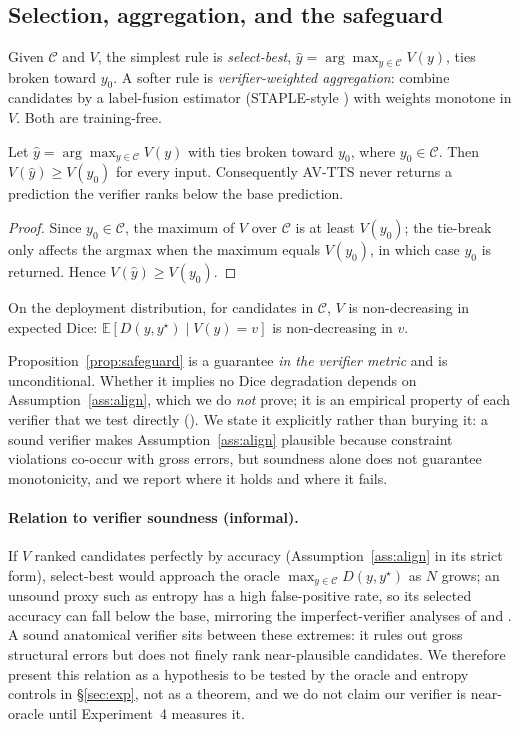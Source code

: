 \documentclass[10pt,twocolumn]{article}
\begin{document}
\subsection{Selection, aggregation, and the safeguard}
Given $\mathcal{C}$ and $V$, the simplest rule is \emph{select-best}, $\hat y=\arg\max_{y\in\mathcal{C}}V(y)$, ties broken toward $y_0$. A softer rule is \emph{verifier-weighted aggregation}: combine candidates by a label-fusion estimator (STAPLE-style \citep{warfield2004staple}) with weights monotone in $V$. Both are training-free.

\begin{proposition}\label{prop:safeguard}
Let $\hat y=\arg\max_{y\in\mathcal{C}}V(y)$ with ties broken toward $y_0$, where $y_0\in\mathcal{C}$. Then $V(\hat y)\ge V(y_0)$ for every input. Consequently AV-TTS never returns a prediction the verifier ranks below the base prediction.
\end{proposition}
\begin{proof}
Since $y_0\in\mathcal{C}$, the maximum of $V$ over $\mathcal{C}$ is at least $V(y_0)$; the tie-break only affects the argmax when the maximum equals $V(y_0)$, in which case $y_0$ is returned. Hence $V(\hat y)\ge V(y_0)$.
\end{proof}

\begin{assumption}\label{ass:align}
On the deployment distribution, for candidates in $\mathcal{C}$, $V$ is non-decreasing in expected Dice: $\mathbb{E}[D(y,y^\star)\mid V(y)=v]$ is non-decreasing in $v$.
\end{assumption}
Proposition~\ref{prop:safeguard} is a guarantee \emph{in the verifier metric} and is unconditional. Whether it implies no Dice degradation depends on Assumption~\ref{ass:align}, which we do \emph{not} prove; it is an empirical property of each verifier that we test directly (). We state it explicitly rather than burying it: a sound verifier makes Assumption~\ref{ass:align} plausible because constraint violations co-occur with gross errors, but soundness alone does not guarantee monotonicity, and we report where it holds and where it fails.

\paragraph{Relation to verifier soundness (informal).} If $V$ ranked candidates perfectly by accuracy (Assumption~\ref{ass:align} in its strict form), select-best would approach the oracle $\max_{y\in\mathcal C}D(y,y^\star)$ as $N$ grows; an unsound proxy such as entropy has a high false-positive rate, so its selected accuracy can fall below the base, mirroring the imperfect-verifier analyses of \citet{stroebl2024verifier} and \citet{setlur2025verifier}. A sound anatomical verifier sits between these extremes: it rules out gross structural errors but does not finely rank near-plausible candidates. We therefore present this relation as a hypothesis to be tested by the oracle and entropy controls in \S\ref{sec:exp}, not as a theorem, and we do not claim our verifier is near-oracle until Experiment~4 measures it.
\end{document}
